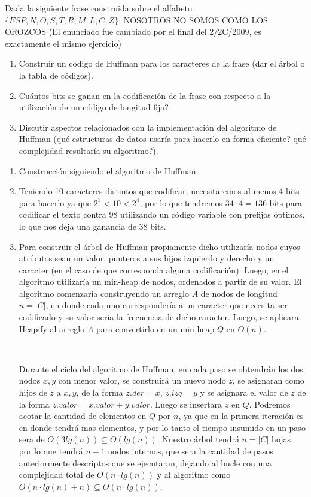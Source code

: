\documentclass[10pt, a4paper]{article}
\begin{document}
Dada la siguiente frase construida sobre el alfabeto $\{ESP,N,O,S,T,R,M,L,C,Z\}$: NOSOTROS NO SOMOS COMO LOS OROZCOS
(El enunciado fue cambiado por el final del 2/2C/2009, es exactamente el mismo ejercicio)

\begin{enumerate}
 \item Construir un c\'odigo de Huffman para los caracteres de la frase (dar el \'arbol o la tabla de c\'odigos).
 \item Cu\'antos bits se ganan en la codificaci\'on de la frase con respecto a la utilizaci\'on de un c\'odigo de longitud fija?
 \item Discutir aspectos relacionados con la implementaci\'on del algoritmo de Huffman (qu\'e estructuras de datos usar\'ia para hacerlo en forma eficiente? qu\'e complejidad resultar\'ia su algoritmo?).
\end{enumerate}

\begin{enumerate}
 \item Construcci\'on siguiendo el algoritmo de Huffman.
 \item Teniendo 10 caracteres distintos que codificar, necesitaremos al menos 4 bits para hacerlo ya que $2^3 < 10 < 2^4$, por lo que tendremos $34 \cdot 4 = 136$ bits para codificar el texto contra $98$ utilizando un c\'odigo variable con prefijos \'optimos, lo que nos deja una ganancia de $38$ bits.
 \item Para construir el \'arbol de Huffman propiamente dicho utilizar\'ia nodos cuyos atributos sean un valor, punteros a sus hijos izquierdo y derecho y un caracter (en el caso de que corresponda alguna codificaci\'on). Luego, en el algoritmo utilizar\'ia un min-heap de nodos, ordenados a partir de su valor. El algoritmo comenzar\'ia construyendo un arreglo $A$ de nodos de longitud $n = |C|$, en donde cada uno corresponder\'ia a un caracter que necesita ser codificado y su valor seria la frecuencia de dicho caracter. Luego, se aplicara Heapify al arreglo $A$ para convertirlo en un min-heap $Q$ en $O(n)$.
 
 ~
 
 Durante el ciclo del algoritmo de Huffman, en cada paso se obtendr\'an los dos nodos $x,y$ con menor valor, se construir\'a un nuevo nodo $z$, se asignaran como hijos de $z$ a $x,y$, de la forma $z.der = x$, $z.izq = y$ y se asignara el valor de $z$ de la forma $z.valor = x.valor + y.valor$. Luego se insertara $z$ en $Q$. Podremos acotar la cantidad de elementos en $Q$ por $n$, ya que en la primera iteraci\'on es en donde tendr\'a mas elementos, y por lo tanto el tiempo insumido en un paso sera de $O(3lg(n)) \subseteq O(lg(n))$. Nuestro \'arbol tendr\'a $n = |C|$ hojas, por lo que tendr\'a $n-1$ nodos internos, que sera la cantidad de pasos anteriormente descriptos que se ejecutaran, dejando al bucle con una complejidad total de $O(n \cdot lg(n))$ y al algoritmo como $O(n \cdot lg(n) + n) \subseteq O(n \cdot lg(n))$.
\end{enumerate}
\end{document}
